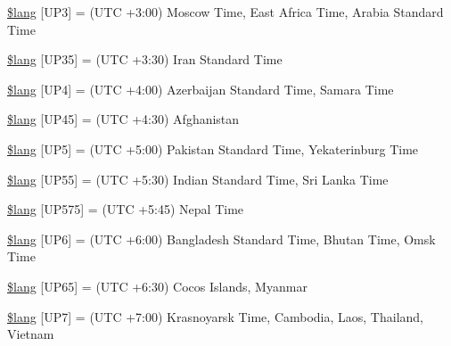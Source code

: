 \begin{DoxyCompactItemize}
\item 
\hyperlink{date__lang_8php_a5eddd4b83edcbefcc883077949d40a67}{\$lang} \mbox{[}\textquotesingle{}U\+P3\textquotesingle{}\mbox{]} = \textquotesingle{}(U\+T\+C +3\+:00) Moscow Time, East Africa Time, Arabia Standard Time\textquotesingle{}
\item 
\hyperlink{date__lang_8php_ad669ea69fd450762d029592b6ac64395}{\$lang} \mbox{[}\textquotesingle{}U\+P35\textquotesingle{}\mbox{]} = \textquotesingle{}(U\+T\+C +3\+:30) Iran Standard Time\textquotesingle{}
\item 
\hyperlink{date__lang_8php_ad0131a14a1ede9328baf1a1827602f45}{\$lang} \mbox{[}\textquotesingle{}U\+P4\textquotesingle{}\mbox{]} = \textquotesingle{}(U\+T\+C +4\+:00) Azerbaijan Standard Time, Samara Time\textquotesingle{}
\item 
\hyperlink{date__lang_8php_a7795735f3608127d726a4fca3f87dc79}{\$lang} \mbox{[}\textquotesingle{}U\+P45\textquotesingle{}\mbox{]} = \textquotesingle{}(U\+T\+C +4\+:30) Afghanistan\textquotesingle{}
\item 
\hyperlink{date__lang_8php_a08236ffa5ff4db9f2bc023f5256fead1}{\$lang} \mbox{[}\textquotesingle{}U\+P5\textquotesingle{}\mbox{]} = \textquotesingle{}(U\+T\+C +5\+:00) Pakistan Standard Time, Yekaterinburg Time\textquotesingle{}
\item 
\hyperlink{date__lang_8php_aa55a1ebecdfbd5e0c7e40c921b90cad2}{\$lang} \mbox{[}\textquotesingle{}U\+P55\textquotesingle{}\mbox{]} = \textquotesingle{}(U\+T\+C +5\+:30) Indian Standard Time, Sri Lanka Time\textquotesingle{}
\item 
\hyperlink{date__lang_8php_abc4186fc3bc853aa036b5b11eeb52ecd}{\$lang} \mbox{[}\textquotesingle{}U\+P575\textquotesingle{}\mbox{]} = \textquotesingle{}(U\+T\+C +5\+:45) Nepal Time\textquotesingle{}
\item 
\hyperlink{date__lang_8php_aaa655de76a3be875d9cedbf4a57244fa}{\$lang} \mbox{[}\textquotesingle{}U\+P6\textquotesingle{}\mbox{]} = \textquotesingle{}(U\+T\+C +6\+:00) Bangladesh Standard Time, Bhutan Time, Omsk Time\textquotesingle{}
\item 
\hyperlink{date__lang_8php_af94f885b6e6c50abdf7672ddfa80774d}{\$lang} \mbox{[}\textquotesingle{}U\+P65\textquotesingle{}\mbox{]} = \textquotesingle{}(U\+T\+C +6\+:30) Cocos Islands, Myanmar\textquotesingle{}
\item 
\hyperlink{date__lang_8php_aeedffaf1d3a16a41e881d85c420482ce}{\$lang} \mbox{[}\textquotesingle{}U\+P7\textquotesingle{}\mbox{]} = \textquotesingle{}(U\+T\+C +7\+:00) Krasnoyarsk Time, Cambodia, Laos, Thailand, Vietnam\textquotesingle{}

\end{DoxyCompactItemize}
